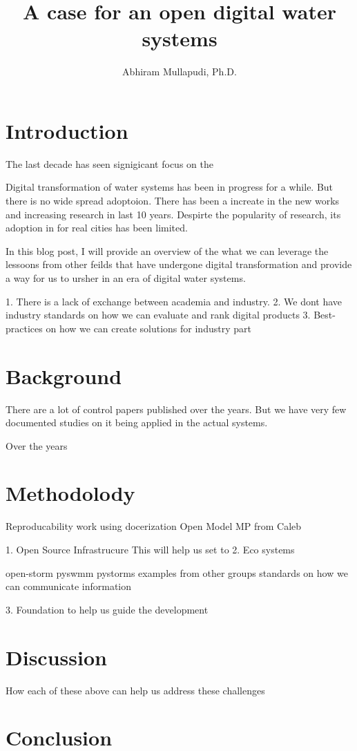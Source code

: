 \documentclass{article}
\title{A case for an open digital water systems}
\author{Abhiram Mullapudi, Ph.D.}
\begin{document}
\maketitle
\section{Introduction}
The last decade has seen signigicant focus on the 


Digital transformation of water systems has been in progress for a while.
But there is no wide spread adoptoion. 
There has been a increate in the new works and increasing research in last 10 years. 
Despirte the popularity of research, its adoption in for real cities has been limited. 

In this blog post, I will provide an overview of the what we can leverage the lessoons from other feilds that have undergone digital transformation and provide a way for us to ursher in an era of digital water systems. 

1. There is a lack of exchange between academia and industry. 
2. We dont have industry standards on how we can evaluate and rank digital products
3. Best-practices on how we can create solutions for industry part

\section{Background}
There are a lot of control papers published over the years. But we have very few documented studies on it being applied in the actual systems.

Over the years 
\section{Methodolody}
Reproducability work using docerization 
Open Model MP from Caleb


1. Open Source Infrastrucure
This will help us set to 
2. Eco systems

open-storm 
pyswmm
pystorms
examples from other groups
standards on how we can communicate information 


3. Foundation to help us guide the development


\section{Discussion}
How each of these above can help us address these challenges
\section{Conclusion}
\end{document}
